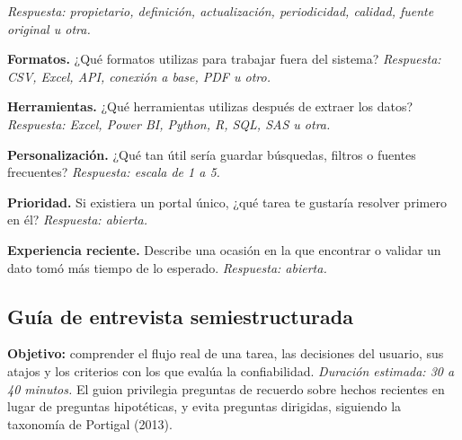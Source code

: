 \begin{uxpreg}
  \textit{\textcolor{uxmuted}{Respuesta: propietario, definición, actualización, periodicidad,
  calidad, fuente original u otra.}}
\item \textbf{Formatos.} ¿Qué formatos utilizas para trabajar fuera del sistema?
  \textit{\textcolor{uxmuted}{Respuesta: CSV, Excel, API, conexión a base, PDF u otro.}}
\item \textbf{Herramientas.} ¿Qué herramientas utilizas después de extraer los datos?
  \textit{\textcolor{uxmuted}{Respuesta: Excel, Power BI, Python, R, SQL, SAS u otra.}}
\item \textbf{Personalización.} ¿Qué tan útil sería guardar búsquedas, filtros o fuentes
  frecuentes? \textit{\textcolor{uxmuted}{Respuesta: escala de 1 a 5.}}
\item \textbf{Prioridad.} Si existiera un portal único, ¿qué tarea te gustaría resolver
  primero en él? \textit{\textcolor{uxmuted}{Respuesta: abierta.}}
\item \textbf{Experiencia reciente.} Describe una ocasión en la que encontrar o validar un
  dato tomó más tiempo de lo esperado. \textit{\textcolor{uxmuted}{Respuesta: abierta.}}
\end{uxpreg}

\subsection{Guía de entrevista semiestructurada}

\textbf{\textcolor{uxnavy}{Objetivo:}} comprender el flujo real de una tarea, las decisiones
del usuario, sus atajos y los criterios con los que evalúa la confiabilidad.
\textit{Duración estimada: 30 a 40 minutos.} El guion privilegia preguntas de recuerdo sobre
hechos recientes en lugar de preguntas hipotéticas, y evita preguntas dirigidas, siguiendo la
taxonomía de Portigal (2013).

